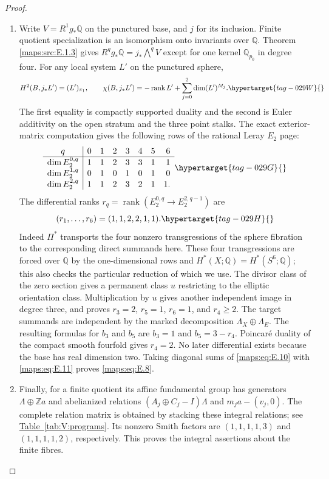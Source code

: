 \documentclass[11pt,a4paper]{article}
\numberwithin{equation}{section}
\theoremstyle{definition}
\begin{document}
\begin{proof}
\begin{enumerate}[label=\arabic*.,leftmargin=*]
\item Write $V=R^1g_*\mathbb Q$ on the punctured base, and $j$ for its
inclusion.  Finite quotient specialization is an isomorphism onto
invariants over $\mathbb Q$.  Theorem \ref{maps:src:E.1.3} gives
$R^qg_*\mathbb Q=j_*\bigwedge^qV$ except for one kernel
$\mathbb Q_{p_0}$ in degree four.  For any local system $L'$ on
the punctured sphere,
\begin{equation}
 H^2(B,j_*L')=(L')_{\pi_1},\qquad
 \chi(B,j_*L')=-\operatorname{rank}L'+
       \sum_{j=0}^2\dim (L')^{M_j}.
 \hypertarget{tag-029W}{}\label{maps:eq:E.9}
\end{equation}
The first equality is compactly supported duality and the second is
Euler additivity on the open stratum and the three point stalks.
The exact exterior-matrix computation gives the following rows of
the rational Leray $E_2$ page:
\begin{equation}
\begin{array}{c|rrrrrrr}
q&0&1&2&3&4&5&6\\ \hline
\dim E_2^{0,q}&1&1&2&3&3&1&1\\
\dim E_2^{1,q}&0&1&0&1&0&1&0\\
\dim E_2^{2,q}&1&1&2&3&2&1&1.
\end{array}
\hypertarget{tag-029G}{}\label{maps:eq:E.10}
\end{equation}
  The differential ranks
$r_q=\operatorname{rank}(E_2^{0,q}\to E_2^{2,q-1})$ are
\begin{equation}
 (r_1,\ldots,r_6)=(1,1,2,2,1,1).
 \hypertarget{tag-029H}{}\label{maps:eq:E.11}
\end{equation}
Indeed $\Pi^*$ transports the four nonzero transgressions of the
sphere fibration to the corresponding direct summands here.
These four transgressions are forced over $\mathbb Q$ by the
one-dimensional rows and $H^*(X;\mathbb Q)=H^*(S^6;\mathbb Q)$;
this also checks the particular reduction of
\cite[Lemma~7.6, p.~21]{E26} which we use.  The divisor class of the zero section gives a
permanent class $u$ restricting to the elliptic orientation class.
Multiplication by $u$ gives another independent image in degree
three, and proves $r_3=2$, $r_5=1$, $r_6=1$, and $r_4\geq2$.
The target summands are independent by the marked decomposition
$\Lambda_X\oplus\Lambda_E$.  The resulting formulas for $b_3$
and $b_5$ are $b_3=1$ and $b_5=3-r_4$.  Poincar\'e duality of
the compact smooth fourfold gives $r_4=2$.  No later differential
exists because the base has real dimension two.  Taking diagonal
sums of \eqref{maps:eq:E.10} with \eqref{maps:eq:E.11} proves \eqref{maps:eq:E.8}.

\item Finally, for a finite quotient its affine fundamental group has
generators $\Lambda\oplus\mathbb Z a$ and abelianized relations
$(A_j\oplus C_j-I)\Lambda$ and $m_ja-(v_j,0)$. The complete relation matrix is obtained by stacking these integral relations; see \hyperlink{prog:V:resolved}{Table~\ref*{tab:V:programs}}.
Its nonzero Smith factors are $(1,1,1,1,3)$ and
$(1,1,1,1,2)$, respectively.  This proves the integral assertions
about the finite fibres.
\end{enumerate}
\end{proof}
\end{document}
